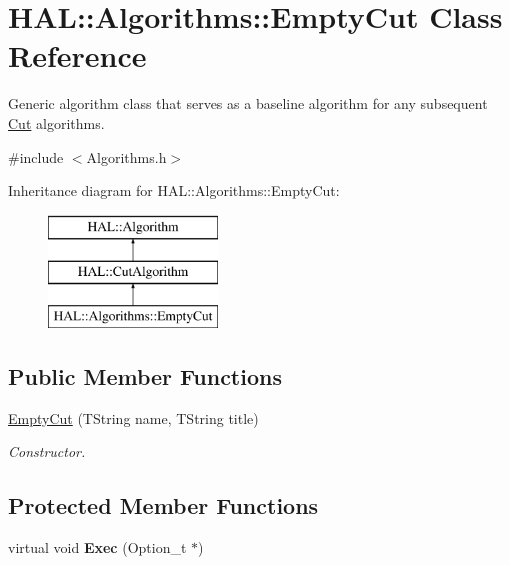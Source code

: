 \hypertarget{class_h_a_l_1_1_algorithms_1_1_empty_cut}{\section{H\+A\+L\+:\+:Algorithms\+:\+:Empty\+Cut Class Reference}
\label{class_h_a_l_1_1_algorithms_1_1_empty_cut}
}


Generic algorithm class that serves as a baseline algorithm for any subsequent \hyperlink{class_h_a_l_1_1_algorithms_1_1_cut}{Cut} algorithms.  




{\ttfamily \#include $<$Algorithms.\+h$>$}

Inheritance diagram for H\+A\+L\+:\+:Algorithms\+:\+:Empty\+Cut\+:\begin{figure}[H]
\begin{center}
\leavevmode
\includegraphics[height=3.000000cm]{class_h_a_l_1_1_algorithms_1_1_empty_cut}
\end{center}
\end{figure}
\subsection*{Public Member Functions}
\begin{DoxyCompactItemize}
\item 
\hyperlink{class_h_a_l_1_1_algorithms_1_1_empty_cut_a07eb3faf7e5ee7f913065cb01622cd8f}{Empty\+Cut} (T\+String name, T\+String title)
\begin{DoxyCompactList}\small\item\em Constructor. \end{DoxyCompactList}\end{DoxyCompactItemize}
\subsection*{Protected Member Functions}
\begin{DoxyCompactItemize}
\item 
\hypertarget{class_h_a_l_1_1_algorithms_1_1_empty_cut_a39235392c1b3a0f8253114dbcdf0a8a6}{virtual void {\bfseries Exec} (Option\+\_\+t $\ast$)}\label{class_h_a_l_1_1_algorithms_1_1_empty_cut_a39235392c1b3a0f8253114dbcdf0a8a6}

\end{DoxyCompactItemize}
